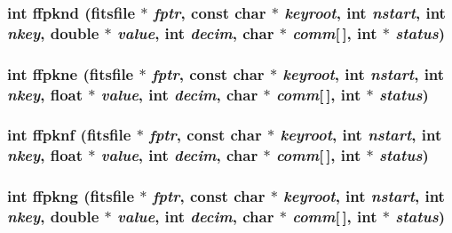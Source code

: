 \subsubsection{\setlength{\rightskip}{0pt plus 5cm}int ffpknd (\bf{fitsfile} $\ast$ {\em fptr}, const char $\ast$ {\em keyroot}, int {\em nstart}, int {\em nkey}, double $\ast$ {\em value}, int {\em decim}, char $\ast$ {\em comm}[$\,$], int $\ast$ {\em status})}\label{test_2shm__client_2fitsio_8h_9434b6e4c0a60dc83ac3faa0e1f14c7f}


\subsubsection{\setlength{\rightskip}{0pt plus 5cm}int ffpkne (\bf{fitsfile} $\ast$ {\em fptr}, const char $\ast$ {\em keyroot}, int {\em nstart}, int {\em nkey}, float $\ast$ {\em value}, int {\em decim}, char $\ast$ {\em comm}[$\,$], int $\ast$ {\em status})}\label{test_2shm__client_2fitsio_8h_652c4d9b762686c56d4be0c73bc0a7c1}


\subsubsection{\setlength{\rightskip}{0pt plus 5cm}int ffpknf (\bf{fitsfile} $\ast$ {\em fptr}, const char $\ast$ {\em keyroot}, int {\em nstart}, int {\em nkey}, float $\ast$ {\em value}, int {\em decim}, char $\ast$ {\em comm}[$\,$], int $\ast$ {\em status})}\label{test_2shm__client_2fitsio_8h_640c17ad783164b2cd324f679a4cef36}


\subsubsection{\setlength{\rightskip}{0pt plus 5cm}int ffpkng (\bf{fitsfile} $\ast$ {\em fptr}, const char $\ast$ {\em keyroot}, int {\em nstart}, int {\em nkey}, double $\ast$ {\em value}, int {\em decim}, char $\ast$ {\em comm}[$\,$], int $\ast$ {\em status})}\label{test_2shm__client_2fitsio_8h_74722d16901c4c1f0118ac23366be3ce}


